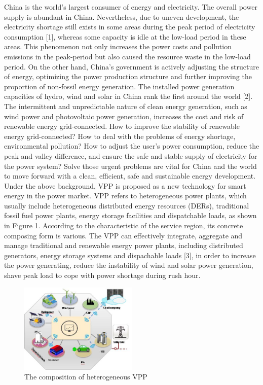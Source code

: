 \documentclass[twocolumn,a4paper]{IEEEtran}
\begin{document}
China is the world's largest consumer of energy and electricity. 
The overall power supply is abundant in China. 
Nevertheless, due to uneven development, the electricity shortage still exists in some areas during the peak period of electricity consumption [1], 
whereas some capacity is idle at the low-load period in these areas. 
This phenomenon not only increases the power costs and pollution emissions in the peak-period but also caused the resource waste in the low-load period. 
On the other hand, China's government is actively adjusting the structure of energy, 
optimizing the power production structure and further improving the proportion of non-fossil energy generation. 
The installed power generation capacities of hydro, wind and solar in China rank the first around the world [2]. 
The intermittent and unpredictable nature of clean energy generation, 
such as wind power and photovoltaic power generation, increases the cost and risk of renewable energy grid-connected. 
How to improve the stability of renewable energy grid-connected? 
How to deal with the problems of energy shortage, environmental pollution? 
How to adjust the user's power consumption, reduce the peak and valley difference, and ensure the safe and stable supply of electricity for the power system? Solve those urgent problems are vital for China and the world to move forward with a clean, efficient, safe and sustainable energy development. 
Under the above background, VPP is proposed as a new technology for smart energy in the power market. 
VPP refers to heterogeneous power plants, which usually include heterogeneous distributed energy resources (DERs), traditional fossil fuel power plants, energy storage facilities and dispatchable loads, as shown in Figure 1. 
According to the characteristic of the service region, its concrete composing form is various. 
The VPP can effectively integrate, aggregate and manage traditional and renewable energy power plants, including distributed generators, energy storage systems and dispachable loads [3], in order to increase the power generating, reduce the instability of wind and solar power generation, shave peak load to cope with power shortage during rush hour. 

\begin{figure}
    \centering
    \includegraphics[width=0.5\textwidth]{figure/figure1.jpg}
    \caption{The composition of heterogeneous VPP}
    \label{The composition of heterogeneous VPP}
\end{figure}
\end{document}
